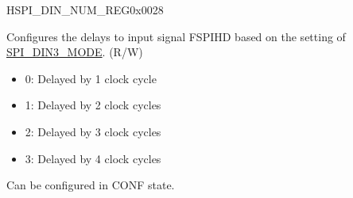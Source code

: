 \begin{register}{H}{SPI\_DIN\_NUM\_REG}{0x0028}
\begin{regdesc}
\begin{reglist}
\label{fielddesc:SPIDIN3NUM}\item [SPI\_DIN3\_NUM] Configures the delays to input signal FSPIHD based on the setting of \hyperref[fielddesc:SPIDIN3MODE]{SPI\_DIN3\_MODE}. (R/W)\\
\begin{itemize}
    \item 0: Delayed by 1 clock cycle
    \item 1: Delayed by 2 clock cycles
    \item 2: Delayed by 3 clock cycles
    \item 3: Delayed by 4 clock cycles
\end{itemize}
Can be configured in CONF state. 
\end{reglist}\end{regdesc}
\end{register}


